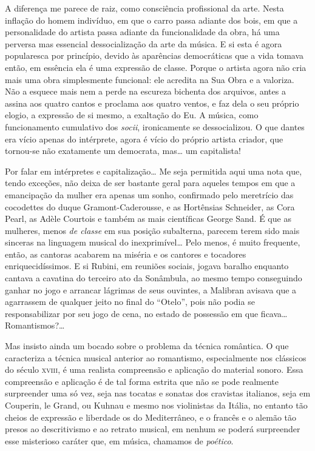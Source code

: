 A diferença me parece de raiz, como consciência profissional da arte.
Nesta inflação do homem indivíduo, em que o carro passa adiante dos
bois, em que a personalidade do artista passa adiante da funcionalidade
da obra, há uma perversa mas essencial dessocialização da arte da
música. E si esta é agora popularesca por princípio, devido às
aparências democráticas que a vida tomava então, em essência ela é uma
expressão de classe. Porque o artista agora não cria mais uma obra
simplesmente funcional: ele acredita na Sua Obra e a valoriza. Não a
esquece mais nem a perde na escureza bichenta dos arquivos, antes a
assina aos quatro cantos e proclama aos quatro ventos, e faz dela o seu
próprio elogio, a expressão de si mesmo, a exaltação do Eu. A música,
como funcionamento cumulativo dos \textit{socii}, ironicamente se dessocializou.
O que dantes era vício apenas do intérprete, agora é vício do próprio
artista criador, que tornou-se não exatamente um democrata, mas\ldots{} um
capitalista!

Por falar em intérpretes e capitalização\ldots{} Me seja permitida aqui uma
nota que, tendo exceções, não deixa de ser bastante geral para aqueles
tempos em que a emancipação da mulher era apenas um sonho, confirmado
pelo meretrício das cocodettes do duque Gramont-Caderousse, e as
Hortênsias Schneider, as Cora Pearl, as Adèle Courtois e também as mais
científicas George Sand. É que as mulheres, menos \textit{de classe} em sua
posição subalterna, parecem terem sido mais sinceras na linguagem
musical do inexprimível\ldots{} Pelo menos, é muito frequente, então, as
cantoras acabarem na miséria e os cantores e tocadores
enriquecidíssimos. E si Rubini, em reuniões sociais, jogava baralho
enquanto cantava a cavatina do terceiro ato da Sonâmbula, ao mesmo tempo
conseguindo ganhar no jogo e arrancar lágrimas de seus ouvintes, a
Malibran avisava que a agarrassem de qualquer jeito no final do ``Otelo'',
pois não podia se responsabilizar por seu jogo de cena, no estado de
possessão em que ficava\ldots{} Romantismos?\ldots{}

Mas insisto ainda um bocado sobre o problema da técnica romântica. O que
caracteriza a técnica musical anterior ao romantismo, especialmente nos
clássicos do século \textsc{xviii}, é uma realista compreensão e aplicação do
material sonoro. Essa compreensão e aplicação é de tal forma estrita que
não se pode realmente surpreender uma só vez, seja nas tocatas e sonatas
dos cravistas italianos, seja em Couperin, le Grand, ou Kuhnau e mesmo nos
violinistas da Itália, no entanto tão cheios de expressão e liberdade os
do Mediterrâneo, e o francês e o alemão tão presos ao descritivismo e ao
retrato musical, em nenhum se poderá surpreender esse misterioso caráter
que, em música, chamamos de \textit{poético}.

